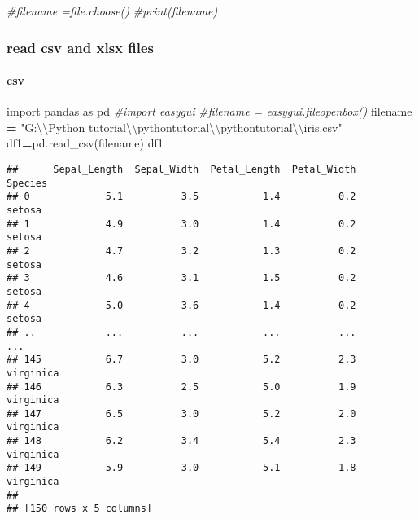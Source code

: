 \documentclass[
]{article}
\newenvironment{Shaded}{\begin{snugshade}}{\end{snugshade}}
\newcommand{\CharTok}[1]{\textcolor[rgb]{0.31,0.60,0.02}{#1}}
\newcommand{\CommentTok}[1]{\textcolor[rgb]{0.56,0.35,0.01}{\textit{#1}}}
\newcommand{\ImportTok}[1]{#1}
\newcommand{\NormalTok}[1]{#1}
\newcommand{\OperatorTok}[1]{\textcolor[rgb]{0.81,0.36,0.00}{\textbf{#1}}}
\newcommand{\StringTok}[1]{\textcolor[rgb]{0.31,0.60,0.02}{#1}}
\begin{document}
\begin{Shaded}
\begin{Highlighting}[]
\CommentTok{\#filename =file.choose()}
\CommentTok{\#print(filename)}
\end{Highlighting}
\end{Shaded}

\hypertarget{read-csv-and-xlsx-files}{%
\subsubsection{read csv and xlsx files}\label{read-csv-and-xlsx-files}}

\hypertarget{csv}{%
\paragraph{\texorpdfstring{{ csv }}{ csv }}\label{csv}}

\begin{Shaded}
\begin{Highlighting}[]
\ImportTok{import}\NormalTok{ pandas }\ImportTok{as}\NormalTok{ pd}
\CommentTok{\#import easygui}
\CommentTok{\#filename = easygui.fileopenbox()}
\NormalTok{filename }\OperatorTok{=} \StringTok{"G:}\CharTok{\textbackslash{}\textbackslash{}}\StringTok{Python tutorial}\CharTok{\textbackslash{}\textbackslash{}}\StringTok{pythontutorial}\CharTok{\textbackslash{}\textbackslash{}}\StringTok{pythontutorial}\CharTok{\textbackslash{}\textbackslash{}}\StringTok{iris.csv"}
\NormalTok{df1}\OperatorTok{=}\NormalTok{pd.read\_csv(filename)}
\NormalTok{df1}
\end{Highlighting}
\end{Shaded}

\begin{verbatim}
##      Sepal_Length  Sepal_Width  Petal_Length  Petal_Width    Species
## 0             5.1          3.5           1.4          0.2     setosa
## 1             4.9          3.0           1.4          0.2     setosa
## 2             4.7          3.2           1.3          0.2     setosa
## 3             4.6          3.1           1.5          0.2     setosa
## 4             5.0          3.6           1.4          0.2     setosa
## ..            ...          ...           ...          ...        ...
## 145           6.7          3.0           5.2          2.3  virginica
## 146           6.3          2.5           5.0          1.9  virginica
## 147           6.5          3.0           5.2          2.0  virginica
## 148           6.2          3.4           5.4          2.3  virginica
## 149           5.9          3.0           5.1          1.8  virginica
## 
## [150 rows x 5 columns]
\end{verbatim}
\end{document}
